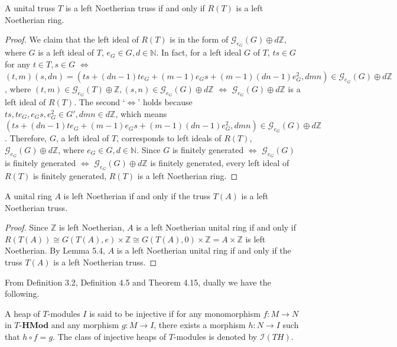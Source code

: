 \documentclass[11pt, twoside]{article}
\begin{document}
\begin{lemma}
A unital truss $T$ is a left Noetherian truss if and only if $R(T)$ is a left Noetherian ring.
\end{lemma}
\begin{proof}
We claim that the left ideal of $R(T)$ is in the form of $\mathcal{G}_{e_G}(G)\oplus d\mathbb{Z}$, where $G$ is a left ideal of $T$, $e_G\in G,d\in \mathbb{N}$. In fact, for a left ideal $G$ of $T$, $ts\in G$ for any $t\in T,s\in G$ $\Leftrightarrow$ $(t,m)(s,dn)=(ts+(dn-1)te_G+(m-1)e_Gs+(m-1)(dn-1)e_G^2,dmn)\in \mathcal{G}_{e_G}(G)\oplus d\mathbb{Z}$,  where $(t,m)\in \mathcal{G}_{e_G}(T)\oplus \mathbb{Z},(s,n)\in \mathcal{G}_{e_G}(G)\oplus d\mathbb{Z}$ $\Leftrightarrow$ $\mathcal{G}_{e_G}(G)\oplus d\mathbb{Z}$ is a left ideal of $R(T)$. The second `$\Leftrightarrow$' holds because $ts,te_G,e_Gs,e_G^2\in G',dmn\in d\mathbb{Z}$, which means $(ts+(dn-1)te_G+(m-1)e_Gs+(m-1)(dn-1)e_G^2,dmn) \in \mathcal{G}_{e_G}(G)\oplus d\mathbb{Z}$. Therefore, $G$, a left ideal of $T$, corresponds to left ideals of $R(T)$, $\mathcal{G}_{e_G}(G)\oplus d\mathbb{Z}$, where $e_G\in G,d\in \mathbb{N}$. Since $G$ is finitely generated $\Leftrightarrow$ $\mathcal{G}_{e_G}(G)$ is finitely generated $\Leftrightarrow$ $\mathcal{G}_{e_G}(G)\oplus d\mathbb{Z}$ is finitely generated, every left ideal of $R(T)$ is finitely generated, $R(T)$ is a left Noetherian ring.
\end{proof}

\begin{corollary}
A unital ring $A$ is left Noetherian if and only if the truss $T(A)$ is a left Noetherian truss.
\end{corollary}
\begin{proof}
Since $\mathbb{Z}$ is left Noetherian, $A$ is a left Noetherian unital ring if and only if $R(T(A)) \cong G(T(A),e) \times \mathbb{Z} \cong G(T(A),0) \times \mathbb{Z} = A \times \mathbb{Z}$ is left Noetherian. By Lemma 5.4, $A$ is a left Noetherian unital ring if and only if the truss $T(A)$ is a left Noetherian truss.
\end{proof}

From Definition 3.2, Definition 4.5 and Theorem 4.15, dually we have the following.
\begin{definition}
A heap of $T$-modules $I$ is said to be injective if for any monomorphism $f:M\rightarrow N$ in $T\textbf{-HMod}$ and any morphism $g:M\rightarrow I$, there exists a morphism $h:N\rightarrow I$ such that $h\circ f= g$. The class of injective heaps of $T$-modules is denoted by $\mathcal{I}(TH)$.
\end{definition}
\end{document}
